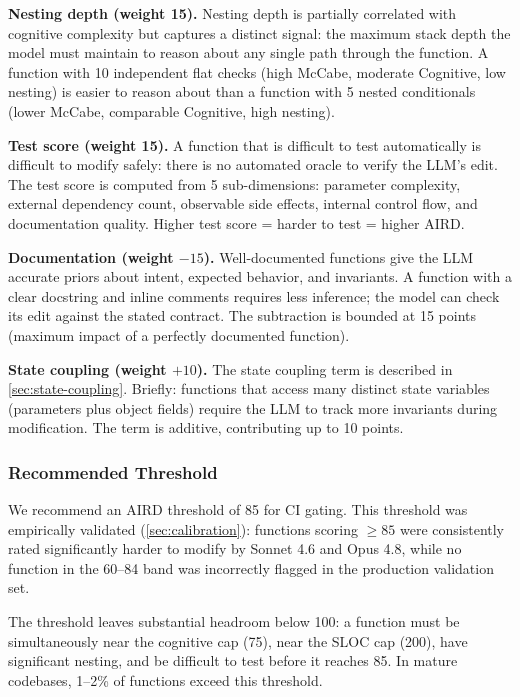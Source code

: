 \documentclass[10pt,twocolumn,letterpaper]{article}
\begin{document}
\textbf{Nesting depth (weight 15).}  Nesting depth is partially
correlated with cognitive complexity but captures a distinct signal: the
maximum stack depth the model must maintain to reason about any single
path through the function.  A function with 10 independent flat checks
(high McCabe, moderate Cognitive, low nesting) is easier to reason about
than a function with 5 nested conditionals (lower McCabe, comparable
Cognitive, high nesting).

\textbf{Test score (weight 15).}  A function that is difficult to test
automatically is difficult to modify safely: there is no automated oracle
to verify the LLM's edit.  The test score is computed from 5 sub-dimensions:
parameter complexity, external dependency count, observable side effects,
internal control flow, and documentation quality.  Higher test score =
harder to test = higher AIRD.

\textbf{Documentation (weight $-15$).}  Well-documented functions give the
LLM accurate priors about intent, expected behavior, and invariants.  A
function with a clear docstring and inline comments requires less
inference; the model can check its edit against the stated contract.  The
subtraction is bounded at 15 points (maximum impact of a perfectly
documented function).

\textbf{State coupling (weight $+10$).}  The state coupling term is
described in \cref{sec:state-coupling}.  Briefly: functions that access
many distinct state variables (parameters plus object fields) require
the LLM to track more invariants during modification.  The term is
additive, contributing up to 10 points.

\subsubsection{Recommended Threshold}

We recommend an AIRD threshold of 85 for CI gating.  This threshold
was empirically validated (\cref{sec:calibration}): functions scoring
$\geq 85$ were consistently rated significantly harder to modify by
Sonnet 4.6 and Opus 4.8, while no function in the 60--84 band was
incorrectly flagged in the production validation set.

The threshold leaves substantial headroom below 100: a function must
be simultaneously near the cognitive cap (75), near the SLOC cap (200),
have significant nesting, and be difficult to test before it reaches 85.
In mature codebases, 1--2\% of functions exceed this threshold.
\end{document}

